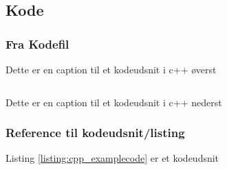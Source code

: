 \subsection{Kode}

\subsubsection{Fra Kodefil}

\begin{code}
	\caption{Dette er en caption til et kodeudsnit i c++ øverst}
	\inputminted{cpp}{sections/03_Elementer/code/cppcodeexample.cpp}
	\label{listing:cpp_examplecode}
	\caption{Dette er en caption til et kodeudsnit i c++ nederst}
\end{code}

\subsubsection{Reference til kodeudsnit/listing}
Listing \ref{listing:cpp_examplecode} er et kodeudsnit
